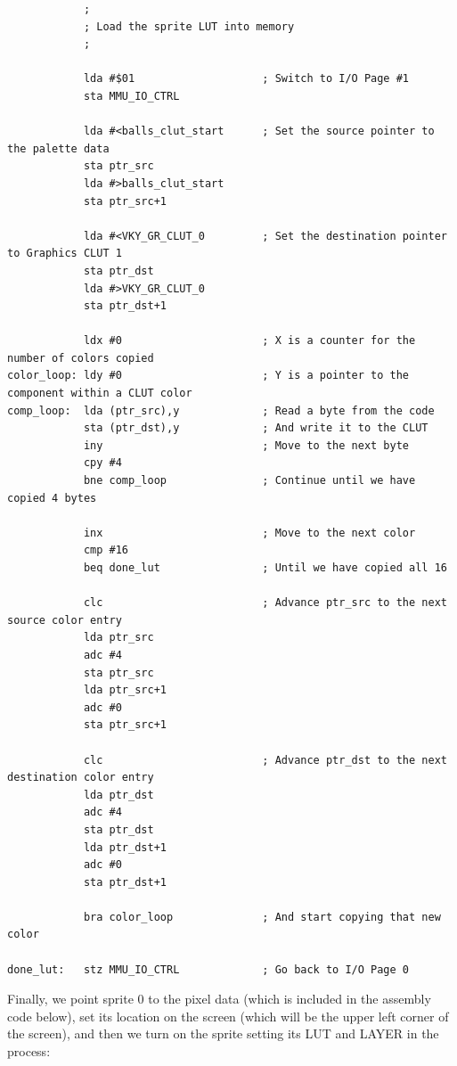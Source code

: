 \begin{verbatim}
            ;
            ; Load the sprite LUT into memory
            ;

            lda #$01                    ; Switch to I/O Page #1
            sta MMU_IO_CTRL

            lda #<balls_clut_start      ; Set the source pointer to the palette data
            sta ptr_src
            lda #>balls_clut_start
            sta ptr_src+1

            lda #<VKY_GR_CLUT_0         ; Set the destination pointer to Graphics CLUT 1
            sta ptr_dst
            lda #>VKY_GR_CLUT_0
            sta ptr_dst+1

            ldx #0                      ; X is a counter for the number of colors copied
color_loop: ldy #0                      ; Y is a pointer to the component within a CLUT color
comp_loop:  lda (ptr_src),y             ; Read a byte from the code
            sta (ptr_dst),y             ; And write it to the CLUT
            iny                         ; Move to the next byte
            cpy #4
            bne comp_loop               ; Continue until we have copied 4 bytes

            inx                         ; Move to the next color
            cmp #16
            beq done_lut                ; Until we have copied all 16

            clc                         ; Advance ptr_src to the next source color entry
            lda ptr_src
            adc #4
            sta ptr_src
            lda ptr_src+1
            adc #0
            sta ptr_src+1

            clc                         ; Advance ptr_dst to the next destination color entry
            lda ptr_dst
            adc #4
            sta ptr_dst
            lda ptr_dst+1
            adc #0
            sta ptr_dst+1

            bra color_loop              ; And start copying that new color

done_lut:   stz MMU_IO_CTRL             ; Go back to I/O Page 0
\end{verbatim}

Finally, we point sprite 0 to the pixel data (which is included in the assembly code below), set its location on the screen (which will be the upper left corner of the screen), and then we turn on the sprite setting its LUT and LAYER in the process:

